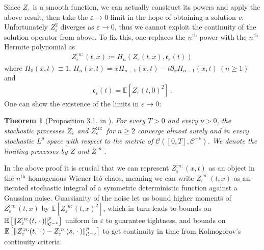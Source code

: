 \documentclass{report}
\DeclarePairedDelimiter\norm{\lVert}{\rVert}%
\newcommand{\Exp}[1]{\mathbb{E}\left[#1\right]}
\newcommand{\Placeholder}{\,\mathrel{\cdot}\,}
\DeclareMathOperator{\DefiningEquality}{\coloneqq}
\newtheorem{theorem}{Theorem}[chapter]
\theoremstyle{remark}
\theoremstyle{definition}
\let\epsilon\varepsilon
\begin{document}
Since $Z_\epsilon$ is a smooth function, we can actually construct its powers and apply the above result, then take the $\epsilon \to 0$ limit in the hope of obtaining a solution $v$. Unfortunately $Z_\epsilon^2$ diverges as $\epsilon \to 0$, thus we cannot exploit the continuity of the solution operator from above. To fix this, one replaces the $n^\text{th}$ power with the $n^\text{th}$ Hermite polynomial as
\begin{align}
  Z_\epsilon^{:n:}(t, x) \DefiningEquality H_n(Z_\epsilon(t, x), \mathfrak{c}_\epsilon(t))\,
\end{align}
where $H_0(x, t) \equiv 1$, $H_{n}(x, t) = x H_{n-1}(x, t) - t \partial_x H_{n-1}(x, t)~(n \ge 1)$ and
\begin{align*}
  \mathfrak{c}_\epsilon(t) = \Exp{Z_\epsilon(t, 0)^2}\,.
\end{align*}
One can show the existence of the limits in $\epsilon \to 0$:
\begin{theorem}[Proposition 3.1. in \cite{mourrat2015convergencetwodimensionaldynamicisingkac}]
  For every $T > 0$ and every $\nu > 0$, the stochastic processes $Z_\epsilon$ and $Z_\epsilon^{:n:}$ for $n \ge 2$ converge almost surely and in every stochastic $L^p$ space with respect to the metric of $\mathcal{C}([0, T], \mathcal{C}^{-\nu})$. We denote the limiting processes by $Z$ and $Z^{:n:}$.
\end{theorem}
In the above proof it is crucial that we can represent $Z_\epsilon^{:n:}(x, t)$ as an object in the $n^\text{th}$ homogenous Wiener-Itô chaos, meaning we can write $Z_\epsilon^{:n:}(t, x)$ as an iterated stochastic integral of a symmetric deterministic function against a Gaussian noise. Guassianity of the noise let us bound higher moments of $Z_\epsilon^{:n:}(t, x)$ by $\Exp{Z_\epsilon^{:n:}(t, x)^2}$, which in turn leads to bounds on $\Exp{\norm{Z_\epsilon^{:n:}(t, \Placeholder)}^p_{\mathcal{C}^{-\nu}}}$ uniform in $\epsilon$ to guarantee tightness, and bounds on $\Exp{\norm{Z_\epsilon^{:n:}(t, \Placeholder) - Z_\epsilon^{:n:}(s, \Placeholder)}^p_{\mathcal{C}^{-\nu}}}$ to get continuity in time from Kolmogorov's continuity criteria.
\end{document}
